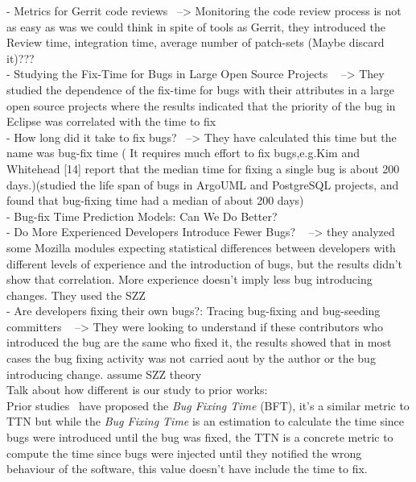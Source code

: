 \documentclass[10pt, conference]{IEEEtran}
\begin{document}
- Metrics for Gerrit code reviews~\cite{lehtonen2015metrics} --> Monitoring the code review process is not as easy as was we could think in spite of tools as Gerrit, they introduced the Review time, integration time, average number of patch-sets (Maybe discard it)???\\
- Studying the Fix-Time for Bugs in Large Open Source Projects ~\cite{marks2011studying} --> They studied the dependence of  the fix-time for bugs with their attributes in a large open source projects where the results indicated that the priority of the bug in Eclipse was correlated with the time to fix\\
- How long did it take to fix bugs?~\cite{kim2006long} --> They have calculated this time but the name was bug-fix time ( It requires much effort to fix bugs,e.g.Kim and Whitehead [14] report that the median time for fixing a single bug is about 200 days.)(studied  the  life  span  of  bugs  in  ArgoUML  and  PostgreSQL projects, and found that bug-fixing time had a median of about 200 days)\\
- Bug-fix Time Prediction Models: Can We Do Better? ~\cite{bhattacharya2011bug} \\
- Do More Experienced Developers Introduce Fewer Bugs? ~\cite{izquierdo2012more} --> they analyzed some Mozilla modules expecting statistical differences between developers with different levels of experience and the introduction of bugs, but the results didn't show that correlation. More experience doesn't imply less bug introducing changes. They used the SZZ\\
- Are developers fixing their own bugs?: Tracing bug-fixing and bug-seeding committers ~\cite{izquierdo2011developers} --> They were looking to understand if these contributors who introduced the bug are the same who fixed it, the results showed that in most cases the bug fixing activity was not carried aout by the author or the bug introducing change. assume SZZ theory\\

Talk about how different is our study to prior works:\\

Prior studies~\cite{kim2006long} have proposed the \emph{Bug Fixing Time} (BFT), it's a similar metric to TTN but while the \emph{Bug Fixing Time} is an estimation to calculate the time since bugs were introduced until the bug was fixed, the TTN is a concrete metric to compute the time since bugs were injected until they notified the wrong behaviour of the software, this value doesn't have include the time to fix.
\end{document}
